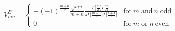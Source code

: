 \begin{equation}
V_{mn}^{B}=\left\{ 
\begin{array}{cl}
-(-1)^{\frac{m+n}{2}}\frac{\sqrt{mn}}{m+n}\frac{\Gamma \lbrack \frac{m}{2}%
]\Gamma \lbrack \frac{n}{2}]}{\pi \Gamma \lbrack \frac{m+1}{2}]\Gamma
\lbrack \frac{n+1}{2}]} & \mathrm{for}\;m\;\mathrm{and}\;n\;\mathrm{odd} \\ 
0 & \mathrm{for}\;m\;\mathrm{or}\;n\;\mathrm{even}
\end{array}
\right.
\end{equation}

